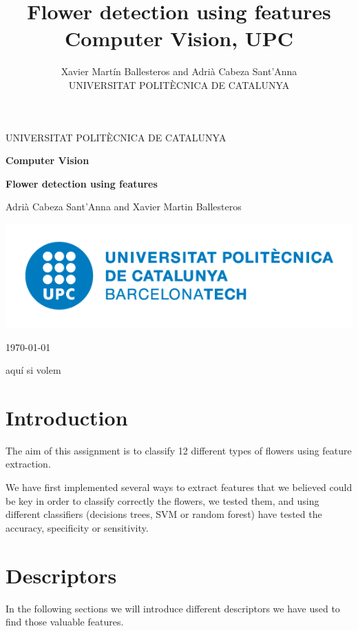\documentclass[12]{article}
\author{Xavier Martín Ballesteros and Adrià Cabeza Sant'Anna \\ \small UNIVERSITAT POLITÈCNICA DE CATALUNYA}
\title{Flower detection using features\\ \large{Computer Vision, UPC}}
\begin{document}

\begin{titlepage}
	\centering
	\vspace{1cm}
	{\scshape\Large UNIVERSITAT POLITÈCNICA DE CATALUNYA\par}
	\vspace{1.5cm}
	{\huge\bfseries Computer Vision \par}
	\vspace{2cm}
	{\Large \textbf{Flower detection using features}\par}
	\vspace{0.2cm}
	{\Large Adrià Cabeza Sant'Anna and Xavier Martin Ballesteros\break \par}
	
	\vspace*{\fill}
	\includegraphics[scale=0.4]{UPClogo.png}\par\vspace{1cm}

	{\large \today}
\end{titlepage}

\newpage
\tableofcontents
\newpage aquí si volem 

\section{Introduction}
The aim of this assignment is to classify 12 different types of flowers using feature extraction. 

We have first implemented several ways to extract features that we believed could be key in order to classify correctly the flowers, we tested them, and using different classifiers (decisions trees, SVM or random forest) have tested the accuracy, specificity or sensitivity. 

\section{Descriptors}
In the following sections we will introduce different descriptors we have used to find those valuable features.
\end{document}
